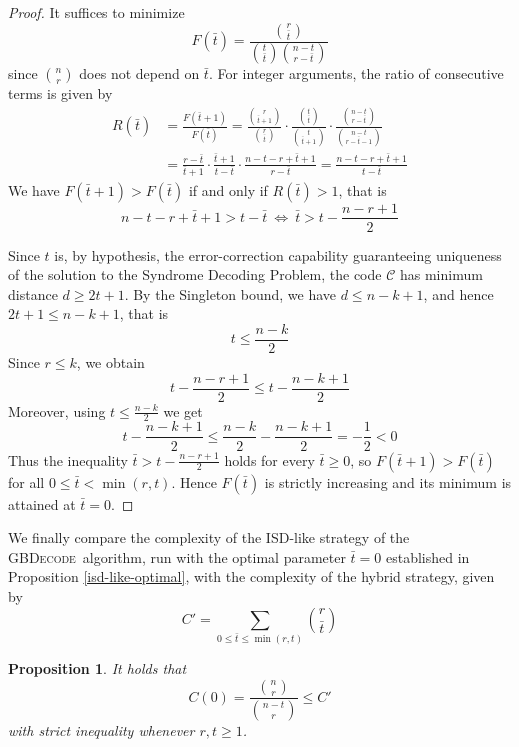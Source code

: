 \documentclass{amsart}
\newtheorem{proposition}[theorem]{Proposition}
\def\GBDecode{{\textsc{GBDecode}}}
\def\cC{{\mathcal{C}}}
\def\bt{{\bar{t}}}
\begin{document}
\begin{proof}
It suffices to minimize
\[
F(\bt) = \frac{\binom{r}{\bt}}{\binom{t}{\bt}\binom{n-t}{r-\bt}}
\]
since $\binom{n}{r}$ does not depend on $\bt$. For integer arguments, the ratio
of consecutive terms is given by
\[
\begin{aligned}
R(\bt) & = \frac{F(\bt+1)}{F(\bt)}
= \frac{\binom{r}{\bt+1}}{\binom{r}{\bt}}
   \cdot \frac{\binom{t}{\bt}}{\binom{t}{\bt+1}}
   \cdot \frac{\binom{n-t}{r-\bt}}{\binom{n-t}{r-\bt-1}} \\
& = \frac{r-\bt}{\bt+1}
   \cdot \frac{\bt+1}{t-\bt}
   \cdot \frac{n-t-r+\bt+1}{r-\bt}
 = \frac{n-t-r+\bt+1}{t-\bt}
\end{aligned}
\]
We have $F(\bt+1) > F(\bt)$ if and only if $R(\bt) > 1$, that is
\[
n - t - r + \bt + 1 > t - \bt
\ \Longleftrightarrow\
\bt > t - \frac{n-r+1}{2}
\]

Since $t$ is, by hypothesis, the error-correction capability guaranteeing uniqueness
of the solution to the Syndrome Decoding Problem, the code $\cC$ has minimum distance
$d\geq 2 t + 1$. By the Singleton bound, we have $d\leq n - k + 1$, and hence
$2 t + 1 \leq n - k + 1$, that is
\[
t \leq \frac{n-k}{2}
\]
Since $r\leq k$, we obtain
\[
t - \frac{n-r+1}{2} \leq t - \frac{n-k+1}{2}
\]
Moreover, using $t \leq \frac{n-k}{2}$ we get
\[
t - \frac{n-k+1}{2}\leq \frac{n-k}{2} - \frac{n-k+1}{2} = -\frac12 < 0
\]
Thus the inequality $\bt > t - \frac{n-r+1}{2}$ holds for every $\bt\geq 0$, so
$F(\bt+1) > F(\bt)$ for all $0\leq \bt < \min(r,t)$. Hence $F(\bt)$ is strictly increasing
and its minimum is attained at $\bt = 0$.
\end{proof}

We finally compare the complexity of the ISD-like strategy of the \GBDecode\ algorithm,
run with the optimal parameter $\bt = 0$ established in Proposition \ref{isd-like-optimal},
with the complexity of the hybrid strategy, given by
\[
C' = \sum_{0\leq \bt\leq \min(r,t)} \binom{r}{\bt}
\]

\begin{proposition}
It holds that
\[
C(0) = \frac{\binom{n}{r}}{\binom{n-t}{r}} \leq C'
\]
with strict inequality whenever $r,t\geq 1$.
\end{proposition}
\end{document}
